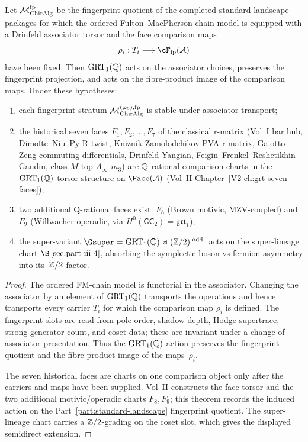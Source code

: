 \begin{theorem}
\label{thm:part-iii-grt-orbit-structure}
Let $\mathcal{M}_{\mathrm{ChirAlg}}^{\mathrm{fp}}$ be the fingerprint quotient of the
completed standard-landscape packages for which the ordered
Fulton--MacPherson chain model is equipped with a Drinfeld associator
torsor and the face comparison maps
\[
\rho_i:T_i\longrightarrow \cF_{\mathrm{fp}}(\cA)
\]
have been fixed. Then $\mathrm{GRT}_1(\mathbb{Q})$ acts on the associator choices,
preserves the fingerprint projection, and acts on the fibre-product
image of the comparison maps. Under these hypotheses:
\begin{enumerate}[label=\textup{(\roman*)}, leftmargin=*]
 \item each fingerprint stratum
 $\mathcal{M}^{(\varphi_0),\mathrm{fp}}_{\mathrm{ChirAlg}}$ is stable under
 associator transport;
 \item the historical seven faces
 $F_1, F_2, \ldots, F_7$ of the classical r-matrix
 \textup{(}Vol~I bar hub, Dimofte--Niu--Py R-twist, Kniznik-Zamolodchikov
 PVA r-matrix, Gaiotto--Zeng commuting differentials, Drinfeld Yangian,
 Feigin--Frenkel--Reshetikhin Gaudin, class-$M$ top $A_\infty$
 $m_3$\textup{)} are $\mathbb{Q}$-rational comparison charts in the
 $\mathrm{GRT}_1(\mathbb{Q})$-torsor structure on $\Face(\cA)$
 \textup{(}Vol~II Chapter~\ref{V2-ch:grt-seven-faces}\textup{)};
 \item two additional Q-rational faces exist:
 $F_8$ \textup{(}Brown motivic, MZV-coupled\textup{)} and
 $F_9$ \textup{(}Willwacher operadic, via
 $H^0(\mathsf{GC}_2) = \mathfrak{grt}_1$\textup{)};
 \item the super-variant
 $\Gsuper = \GRT(\Q) \rtimes (\Z/2)^{|\text{odd}|}$
 acts on the super-lineage chart $\S\,\ref{sec:part-iii-4}$,
 absorbing the symplectic boson-vs-fermion
 asymmetry into its~$\mathbb{Z}/2$-factor.
\end{enumerate}
\end{theorem}
\begin{proof}
The ordered FM-chain model is functorial in the associator. Changing
the associator by an element of $\mathrm{GRT}_1(\mathbb{Q})$ transports the operations
and hence transports every carrier $T_i$ for which the comparison map
$\rho_i$ is defined. The fingerprint slots are read from pole order,
shadow depth, Hodge supertrace, strong-generator count, and coset
data; these are invariant under a change of associator presentation.
Thus the $\mathrm{GRT}_1(\mathbb{Q})$-action preserves the fingerprint quotient and the
fibre-product image of the maps~$\rho_i$.

The seven historical faces are charts on one comparison object only
after the carriers and maps have been supplied. Vol~II constructs the
face torsor and the two additional motivic/operadic charts $F_8,F_9$;
this theorem records the induced action on the
Part~\ref{part:standard-landscape} fingerprint quotient. The
super-lineage chart carries a $\mathbb{Z}/2$-grading on the coset slot, which
gives the displayed semidirect extension.
\end{proof}

